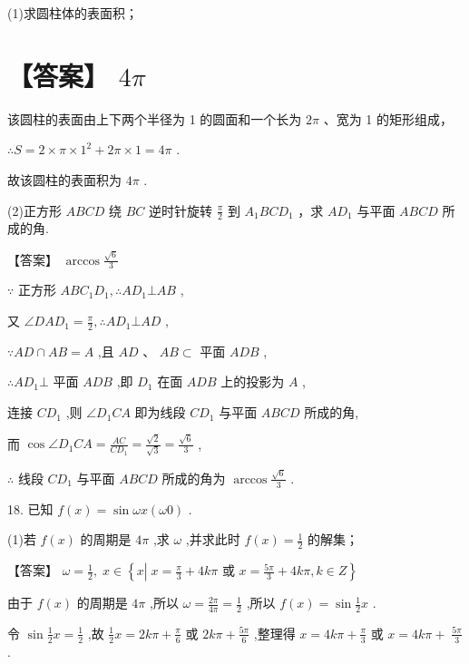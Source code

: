 \documentclass[10pt]{article}
\begin{document}
(1)求圆柱体的表面积；

\section*{【答案】 \({4\pi }\)}

该圆柱的表面由上下两个半径为 1 的圆面和一个长为 \({2\pi }\) 、宽为 1 的矩形组成，

\(\therefore S = 2 \times  \pi  \times  {1}^{2} + {2\pi } \times  1 = {4\pi }\) .

故该圆柱的表面积为 \({4\pi }\) .

(2)正方形 \({ABCD}\) 绕 \({BC}\) 逆时针旋转 \(\frac{\pi }{2}\) 到 \({A}_{1}{BC}{D}_{1}\) ，求 \(A{D}_{1}\) 与平面 \({ABCD}\) 所成的角.

【答案】 \(\arccos \frac{\sqrt{6}}{3}\)

\(\because\) 正方形 \({AB}{C}_{1}{D}_{1},\therefore A{D}_{1} \bot  {AB}\) ,

又 \(\angle {DA}{D}_{1} = \frac{\pi }{2},\therefore A{D}_{1} \bot  {AD}\) ,

\(\because {AD} \cap  {AB} = A\) ,且 \({AD}\text{ 、 }{AB} \subset\) 平面 \({ADB}\) ,

\(\therefore A{D}_{1} \bot\) 平面 \({ADB}\) ,即 \({D}_{1}\) 在面 \({ADB}\) 上的投影为 \(A\) ,

连接 \(C{D}_{1}\) ,则 \(\angle {D}_{1}{CA}\) 即为线段 \(C{D}_{1}\) 与平面 \({ABCD}\) 所成的角,

而 \(\cos \angle {D}_{1}{CA} = \frac{AC}{C{D}_{1}} = \frac{\sqrt{2}}{\sqrt{3}} = \frac{\sqrt{6}}{3}\) ,

\(\therefore\) 线段 \(C{D}_{1}\) 与平面 \({ABCD}\) 所成的角为 \(\arccos \frac{\sqrt{6}}{3}\) .

18. 已知 \(f\left( x\right)  = \sin {\omega x}\left( {\omega 0}\right)\) .

(1)若 \(f\left( x\right)\) 的周期是 \({4\pi }\) ,求 \(\omega\) ,并求此时 \(f\left( x\right)  = \frac{1}{2}\) 的解集；

【答案】 \(\omega  = \frac{1}{2},\;x \in  \left\{  {x\left| {\;x = \frac{\pi }{3} + {4k\pi }\text{ 或 }x = \frac{5\pi }{3} + {4k\pi }}\right. ,k \in  Z}\right\}\)

由于 \(f\left( x\right)\) 的周期是 \({4\pi }\) ,所以 \(\omega  = \frac{2\pi }{4\pi } = \frac{1}{2}\) ,所以 \(f\left( x\right)  = \sin \frac{1}{2}x\) .

令 \(\sin \frac{1}{2}x = \frac{1}{2}\) ,故 \(\frac{1}{2}x = {2k\pi } + \frac{\pi }{6}\) 或 \({2k\pi } + \frac{5\pi }{6}\) ,整理得 \(x = {4k\pi } + \frac{\pi }{3}\) 或 \(x = {4k\pi } + \; \frac{5\pi }{3}\) .
\end{document}
